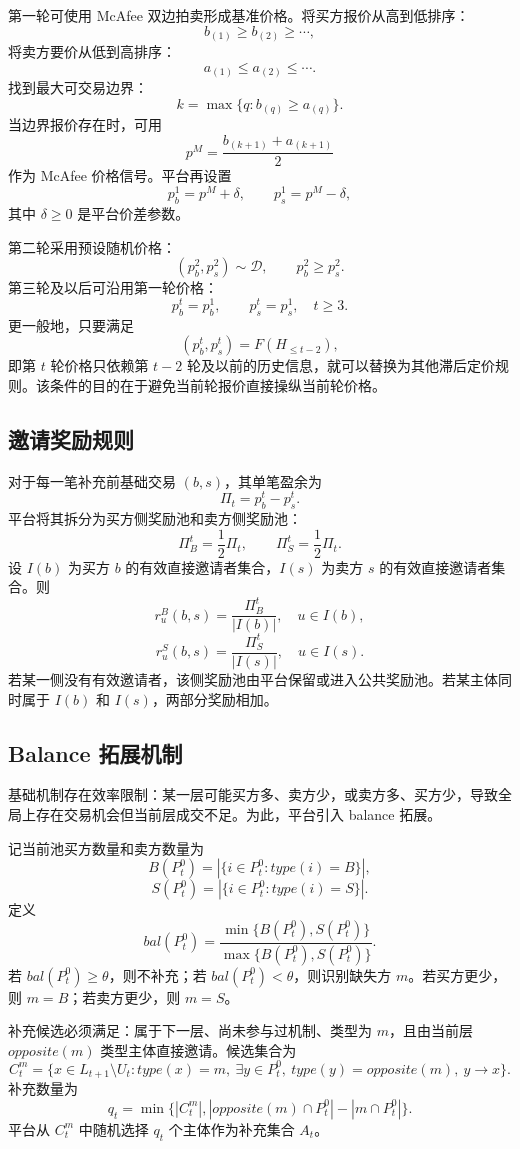\documentclass[UTF8,a4paper,12pt]{ctexart}
\begin{document}
第一轮可使用 McAfee 双边拍卖形成基准价格。将买方报价从高到低排序：
\[
    b_{(1)}\ge b_{(2)}\ge\cdots,
\]
将卖方要价从低到高排序：
\[
    a_{(1)}\le a_{(2)}\le\cdots.
\]
找到最大可交易边界：
\[
    k=\max\{q:b_{(q)}\ge a_{(q)}\}.
\]
当边界报价存在时，可用
\[
    p^M=\frac{b_{(k+1)}+a_{(k+1)}}{2}
\]
作为 McAfee 价格信号。平台再设置
\[
    p_b^1=p^M+\delta,\qquad p_s^1=p^M-\delta,
\]
其中 \(\delta\ge0\) 是平台价差参数。

第二轮采用预设随机价格：
\[
    (p_b^2,p_s^2)\sim\mathcal D,\qquad p_b^2\ge p_s^2.
\]
第三轮及以后可沿用第一轮价格：
\[
    p_b^t=p_b^1,\qquad p_s^t=p_s^1,\quad t\ge3.
\]
更一般地，只要满足
\[
    (p_b^t,p_s^t)=F(H_{\le t-2}),
\]
即第 \(t\) 轮价格只依赖第 \(t-2\) 轮及以前的历史信息，就可以替换为其他滞后定价规则。该条件的目的在于避免当前轮报价直接操纵当前轮价格。

\subsection{邀请奖励规则}

对于每一笔补充前基础交易 \((b,s)\)，其单笔盈余为
\[
    \Pi_t=p_b^t-p_s^t.
\]
平台将其拆分为买方侧奖励池和卖方侧奖励池：
\[
    \Pi_B^t=\frac{1}{2}\Pi_t,\qquad
    \Pi_S^t=\frac{1}{2}\Pi_t.
\]
设 \(I(b)\) 为买方 \(b\) 的有效直接邀请者集合，\(I(s)\) 为卖方 \(s\) 的有效直接邀请者集合。则
\[
    r_u^B(b,s)=\frac{\Pi_B^t}{|I(b)|},\quad u\in I(b),
\]
\[
    r_u^S(b,s)=\frac{\Pi_S^t}{|I(s)|},\quad u\in I(s).
\]
若某一侧没有有效邀请者，该侧奖励池由平台保留或进入公共奖励池。若某主体同时属于 \(I(b)\) 和 \(I(s)\)，两部分奖励相加。

\subsection{Balance 拓展机制}

基础机制存在效率限制：某一层可能买方多、卖方少，或卖方多、买方少，导致全局上存在交易机会但当前层成交不足。为此，平台引入 balance 拓展。

记当前池买方数量和卖方数量为
\[
    B(P_t^0)=|\{i\in P_t^0:type(i)=B\}|,
\]
\[
    S(P_t^0)=|\{i\in P_t^0:type(i)=S\}|.
\]
定义
\[
    bal(P_t^0)=
    \frac{\min\{B(P_t^0),S(P_t^0)\}}
    {\max\{B(P_t^0),S(P_t^0)\}}.
\]
若 \(bal(P_t^0)\ge\theta\)，则不补充；若 \(bal(P_t^0)<\theta\)，则识别缺失方 \(m\)。若买方更少，则 \(m=B\)；若卖方更少，则 \(m=S\)。

补充候选必须满足：属于下一层、尚未参与过机制、类型为 \(m\)，且由当前层 \(opposite(m)\) 类型主体直接邀请。候选集合为
\[
    C_t^m=
    \{x\in L_{t+1}\setminus U_t:
    type(x)=m,\
    \exists y\in P_t^0,\ type(y)=opposite(m),\ y\to x
    \}.
\]
补充数量为
\[
    q_t=
    \min\{
    |C_t^m|,
    |opposite(m)\cap P_t^0|-|m\cap P_t^0|
    \}.
\]
平台从 \(C_t^m\) 中随机选择 \(q_t\) 个主体作为补充集合 \(A_t\)。
\end{document}
